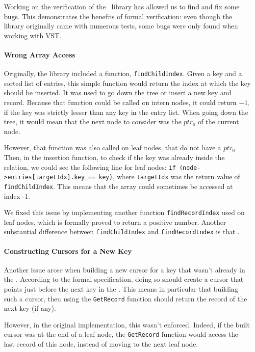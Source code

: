 Working on the verification of the \btrees\ library has allowed us to find and fix some bugs.
This demonstrates the benefits of formal verification: even though the library originally came with numerous tests, some bugs were only found when working with VST.

\paragraph{Wrong Array Access} Originally, the library included a function, \texttt{findChildIndex}.
Given a key and a sorted list of entries, this simple function would return the index at which the key should be inserted.
It was used to go down the tree or insert a new key and record.
Because that function could be called on intern nodes, it could return $-1$, if the key was strictly lesser than any key in the entry list.
When going down the tree, it would mean that the next node to consider was the $ptr_0$ of the current node.

However, that function was also called on leaf nodes, that do not have a $ptr_0$.
Then, in the insertion function, to check if the key was already inside the relation, we could see the following line for leaf nodes:
\texttt{if (node->entries[targetIdx].key == key)}, where \texttt{targetIdx} was the return value of \texttt{findChildIndex}.
This means that the array could sometimes be accessed at index -1.

We fixed this issue by implementing another function \texttt{findRecordIndex} used on leaf nodes, which is formally proved to return a positive number.
Another substantial difference between \texttt{findChildIndex} and \texttt{findRecordIndex} is that .

\paragraph{Constructing Cursors for a New Key}
Another issue arose when building a new cursor for a key that wasn't already in the \btree.
According to the formal specification, doing so should create a cursor that points just before the next key in the \btree.
This means in particular that building such a cursor, then using the \texttt{GetRecord} function should return the record of the next key (if any).

However, in the original implementation, this wasn't enforced.
Indeed, if the built cursor was at the end of a leaf node, the \texttt{GetRecord} function would access the last record of this node, instead of moving to the next leaf node.

